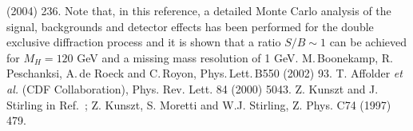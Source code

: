 \begin{thebibliography}{999}
(2004) 236.  
Note that, in this reference, a detailed Monte Carlo analysis of the signal,
backgrounds and detector effects has been performed for the double exclusive
diffraction process and it is shown that a ratio $S/B \sim 1$ can be achieved
for $M_H=120$ GeV and a missing mass resolution of 1 GeV.  
%
 M.\,Boonekamp, R.\,Peschanksi, A.\,de Roeck and 
C.\,Royon, Phys.\,Lett.\,B550 (2002) 93. 
%
 T. Affolder {\it et al.} (CDF Collaboration), Phys. Rev. 
Lett. 84 (2000) 5043. 
 Z. Kunszt and J. Stirling in Ref.~\cite{HiggsLHC};
Z. Kunszt, S. Moretti and W.J. Stirling, Z. Phys. C74 (1997) 479.


\end{thebibliography}
